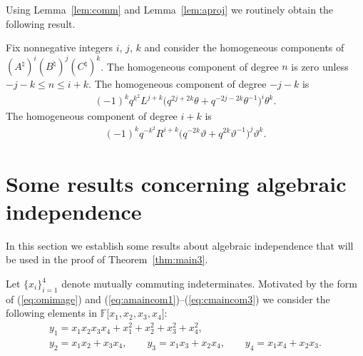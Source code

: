 Using Lemma~\ref{lem:comm}
and Lemma~\ref{lem:aproj} we routinely obtain the following result.


\begin{Lemma}
\label{lem:threeproj}
Fix nonnegative integers $i$, $j$, $k$
and consider the homogeneous components of
$(A^\natural)^i(B^\natural)^j(C^\natural)^k$.
The homogeneous component of degree $n$ is zero unless
$-j-k\leq n \leq i+k$.
The homogeneous component of degree $-j-k$ is
\begin{gather*}
(-1)^k q^{k^2}
L^{j+k}
\big(
q^{2j+2k} \theta
+
q^{-2j-2k} \theta^{-1}
\big)^i
\theta^k.
\end{gather*}
The homogeneous component of degree $i+k$ is
\begin{gather*}
(-1)^k q^{-k^2}
R^{i+k}
\big(
q^{-2k}\vartheta +
q^{2k} \vartheta^{-1}
\big)^j
\vartheta^k.
\end{gather*}
\end{Lemma}

\section{Some results concerning algebraic independence}\label{section8}

In this section we establish some results about
algebraic independence that will be used in the proof of
Theorem~\ref{thm:main3}.


Let $\lbrace x_i\rbrace_{i=1}^4$ denote mutually
commuting indeterminates.
Motivated by the form of
(\ref{eq:omimage}) and
(\ref{eq:amaincom1})--(\ref{eq:cmaincom3}) we consider
the following
elements  in
$\mathbb F\lbrack x_1, x_2, x_3, x_4\rbrack$:
\begin{gather}
 y_1 =
x_1x_2x_3x_4
+x_1^2+x_2^2+x_3^2+x_4^2,
\label{eq:y1def}
\\
y_2 = x_1x_2+x_3x_4,
\qquad
y_3 = x_1x_3+x_2x_4,
\qquad
y_4 = x_1x_4+x_2x_3.
\label{eq:y234def}
\end{gather}

